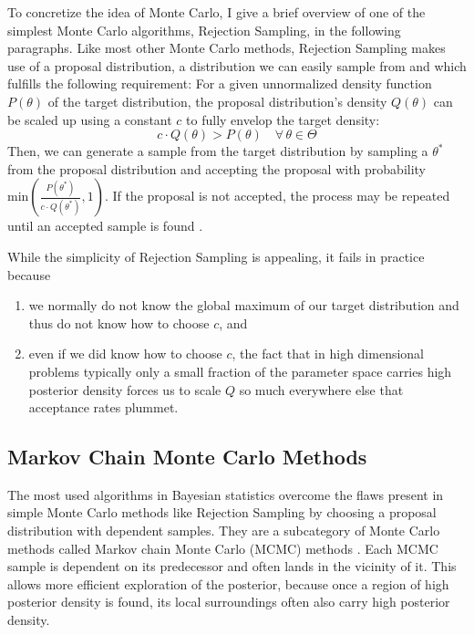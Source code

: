 \documentclass[12pt, a4paper]{report}
\begin{document}
To concretize the idea of Monte Carlo, I give a brief overview of one of the simplest Monte Carlo algorithms, Rejection Sampling, in the following paragraphs.
Like most other Monte Carlo methods, Rejection Sampling makes use of a proposal distribution, a distribution we can easily sample from and which fulfills the following requirement:
For a given unnormalized density function $P(\theta)$ of the target distribution, the proposal distribution's density $Q(\theta)$ can be scaled up using a constant $c$ to fully envelop the target density:
\begin{equation}
    c \cdot Q(\theta) > P(\theta) \quad \forall \, \theta \in \Theta \nonumber
\end{equation}
Then, we can generate a sample from the target distribution by sampling a $\theta^*$ from the proposal distribution and accepting the proposal with probability $\textrm{min}\left(\frac{P(\theta^*)}{c \cdot Q(\theta^*)}, 1 \right)$.
If the proposal is not accepted, the process may be repeated until an accepted sample is found \cite[364]{mckay}.

While the simplicity of Rejection Sampling is appealing, it fails in practice because
\begin{enumerate}
    \item we normally do not know the global maximum of our target distribution and thus do not know how to choose $c$, and
    \item even if we did know how to choose $c$, the fact that in high dimensional problems typically only a small fraction of the parameter space carries high posterior density forces us to scale $Q$ so much everywhere else that acceptance rates plummet.
\end{enumerate}

\subsection{Markov Chain Monte Carlo Methods}
The most used algorithms in Bayesian statistics overcome the flaws present in simple Monte Carlo methods like Rejection Sampling by choosing a proposal distribution with dependent samples.
They are a subcategory of Monte Carlo methods called Markov chain Monte Carlo (MCMC) methods \cite[p. 275 ff.]{bayesian_data_analysis}.
Each MCMC sample is dependent on its predecessor and often lands in the vicinity of it.
This allows more efficient exploration of the posterior, because once a region of high posterior density is found, its local surroundings often also carry high posterior density. 
\end{document}
